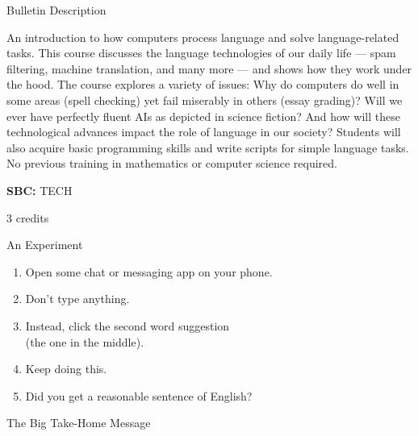 \documentclass[professionalfonts, xcolor={usenames,svgnames,x11names,table}]{beamer}
\begin{document}
\begin{frame}{Bulletin Description}
    \small

    An introduction to how computers process language and solve language-related tasks. This course discusses the language technologies of our daily life --- spam filtering, machine translation, and many more --- and shows how they work under the hood. The course explores a variety of issues: Why do computers do well in some areas (spell checking) yet fail miserably in others (essay grading)? Will we ever have perfectly fluent AIs as depicted in science fiction? And how will these technological advances impact the role of language in our society? Students will also acquire basic programming skills and write scripts for simple language tasks. No previous training in mathematics or computer science required.    

    \textbf{SBC:} TECH

    3 credits
\end{frame}

\begin{frame}{An Experiment}
    \begin{enumerate}
        \item Open some chat or messaging app on your phone.
        \item Don't type anything.
        \item Instead, click the second word suggestion\\
              (the one in the middle).
        \item Keep doing this.
        \item Did you get a reasonable sentence of English?
    \end{enumerate}

\end{frame}

\begin{frame}{The Big Take-Home Message}
    \begin{center}
    \end{center}
\end{frame}
\end{document}
